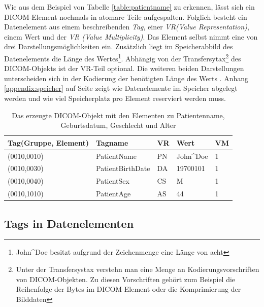 Wie aus dem Beispiel von Tabelle \ref{table:patientname} zu erkennen, lässt sich ein DICOM-Element nochmals in atomare Teile aufgespalten. Folglich besteht ein Datenelement aus einem beschreibenden \textit{Tag}, einer \textit{VR(Value Representation)}, einem Wert und der \textit{VR (Value Multiplicity)}. Das Element selbst nimmt eine von drei Darstellungsmöglichkeiten ein. Zusätzlich liegt im Speicherabbild des Datenelements die Länge des Wertes\footnote{John\^{}Doe besitzt aufgrund der Zeichenmenge eine Länge von acht}. Abhängig von der Transfersytax\footnote{Unter der Transfersystax verstehn man eine Menge an Kodierungsvorschriften von DICOM-Objekten\cite[S.63 Section 10]{dicom:structure}. Zu diesen Vorschriften gehört zum Beispiel die Reihenfolge der Bytes im DICOM-Element oder die Komprimierung der Bilddaten} des DICOM-Objekts ist der VR-Teil optional. Die weiteren beiden Darstellungen unterscheiden sich in der Kodierung der benötigten Länge des Werts \cite[7.1]{dicom:structure}.  Anhang \ref{appendix:speicher} auf Seite \pageref{appendix:speicher} zeigt wie Datenelemente im Speicher abgelegt werden und wie viel Speicherplatz pro Element reserviert werden muss.

\begin{table}
    \begin{tabularx}{\textwidth}{|p{4cm}|p{4cm}|X|X|X|}
    \toprule
    \hline
    \textbf{Tag\newline \small{(Gruppe, Element)}}         & \textbf{Tagname}     & \textbf{VR} & \textbf{Wert}     	& \textbf{VM} \\ \hline
    (0010,0010) 		 & PatientName 			& PN 		  & John\^{}Doe 		& 1  \\ \hline
    (0010,0030) 		 & PatientBirthDate		& DA 		  & 19700101	 		& 1  \\ \hline
    (0010,0040)			 & PatientSex 			& CS 		  & M			 		& 1  \\ \hline
    (0010,1010) 		 & PatientAge 			& AS 		  & 44			 		& 1  \\ \hline
    \bottomrule
    \end{tabularx}
    \caption {Das erzeugte DICOM-Objekt mit den Elementen zu Patientenname, Geburtsdatum, Geschlecht und Alter}
    \label{table:translation}
\end{table}

\subsection{Tags in Datenelementen}

